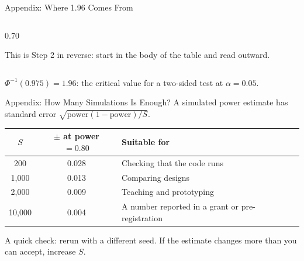 \documentclass[
  ignorenonframetext,
  aspectratio=169,
]{beamer}
\begin{document}
\begin{frame}{Appendix: Where 1.96 Comes From}
\begin{columns}[T]
\begin{column}{0.70\textwidth}
\vspace{0.6em}

\small This is Step 2 in reverse: start in the body of the table and read outward.
\end{column}

\end{columns}

\vspace{0.4em}

\begin{center}
$\Phi^{-1}(0.975) = \mathbf{1.96}$: the critical value for a two-sided test at $\alpha = 0.05$.
\end{center}
\end{frame}

\begin{frame}{Appendix: How Many Simulations Is Enough?}
\label{appendix-how-many-simulations-is-enough}
\small A simulated power estimate has standard error
\(\sqrt{\text{power}(1-\text{power})/S}\).

\vspace{0.5em}

\begin{center}
\small
\setlength{\tabcolsep}{9pt}
\renewcommand{\arraystretch}{1.25}
\begin{tabular}{cc>{\raggedright\arraybackslash}p{6.4cm}}
\toprule
\textbf{$S$} & \textbf{$\pm$ at power $= 0.80$} & \textbf{Suitable for} \\
\midrule
200    & 0.028 & Checking that the code runs \\
1{,}000  & 0.013 & Comparing designs \\
2{,}000  & 0.009 & Teaching and prototyping \\
10{,}000 & 0.004 & A number reported in a grant or pre-registration \\
\bottomrule
\end{tabular}
\end{center}

\vspace{0.5em}

\begin{center}
\small A quick check: rerun with a different seed. If the estimate changes more than you can accept, increase $S$.
\end{center}
\end{frame}
\end{document}
